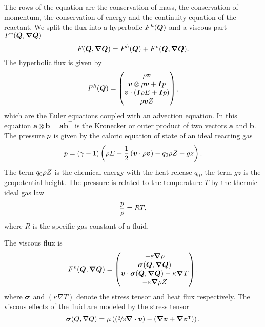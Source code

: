 The rows of the equation are the conservation of mass, the conservation of momentum, the conservation of energy and the continuity equation of the reactant.
We split the flux into a hyperbolic $F^{h}(\bm{Q})$ and a viscous part $\viscFlux(\Q, \gradQ)$
\begin{equation}
  \label{eq:flux}
  \flux(\Q, \gradQ) = \hyperFlux(\Q) + \viscFlux(\Q, \gradQ).
\end{equation}
The hyperbolic flux is given by
\begin{equation}
  \label{eq:hyper-flux}
  F^{h}(\bm{Q}) = \begin{pmatrix} \rho \bm{v} \\ \bm{v} \otimes \rho \bm{v} + \bm{I} p \\ \bm{v} \cdot (\bm{I} \rho E + \bm{I} p) \\ \rho \bm{v} Z \end{pmatrix},
\end{equation}
which are the Euler equations coupled with an advection equation.
In this equation $\bm{a} \otimes \bm{b} = \bm{a} \bm{b}^\intercal$ is the Kronecker or outer product of two vectors $\bm{a}$ and $\bm{b}$.
The pressure $p$ is given by the caloric equation of state of an ideal reacting gas
\begin{equation}
  \label{eq:eos}
  p = (\gamma - 1) \left(\rho E - \frac{1}{2} \left(\bm{v} \cdot \rho \bm{v} \right)  - q_0 \rho Z - gz \right).
\end{equation}
The term $q_0 \rho Z$ is the chemical energy with the heat release $q_0$, the term $gz$ is the geopotential height.
The pressure is related to the temperature $T$ by the thermic ideal gas law
\begin{equation}
  \label{eq:temperature}
 \frac{p}{\rho} = RT,
\end{equation}
where $R$ is the specific gas constant of a fluid.

The viscous flux is
\begin{equation}
  \label{eq:visc-flux}
  \viscFlux(\Q, \gradQ) = \viscFluxDef.
\end{equation}
where $\bm{\sigma}$ and $(\kappa \nabla T)$ denote the stress tensor and heat flux respectively.
The viscous effects of the fluid are modeled by the stress tensor
\begin{equation}
  \label{eq:stress-tensor}
  \stressT(Q, \nabla Q) =
  \mu
  \left(
  \left(\nicefrac{2}{3} \divergence{\Qv} \right) -
  \left( \gradient{\Qv} + \gradient{\Qv}^\intercal \right)
  \right).
\end{equation}

